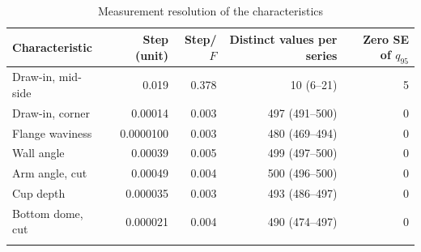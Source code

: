 \documentclass[pdflatex,sn-basic]{sn-jnl}
\newcommand{\tabsize}{\fontsize{8}{9.5}\selectfont}
\begin{document}
\begin{table}[tbp]
\tabsize
\setlength{\tabcolsep}{6pt}
\caption{Measurement resolution of the characteristics}\label{tab:resolution}
\begin{tabular}{@{}lrrrr@{}}
\toprule
Characteristic & Step (unit) & Step/$F$ & Distinct values per series & Zero SE of $q_{95}$ \\
\midrule
Draw-in, mid-side & 0.019 & 0.378 & 10 (6--21) & 5 \\
Draw-in, corner & 0.00014 & 0.003 & 497 (491--500) & 0 \\
Flange waviness & 0.0000100 & 0.003 & 480 (469--494) & 0 \\
Wall angle & 0.00039 & 0.005 & 499 (497--500) & 0 \\
Arm angle, cut & 0.00049 & 0.004 & 500 (496--500) & 0 \\
Cup depth & 0.000035 & 0.003 & 493 (486--497) & 0 \\
Bottom dome, cut & 0.000021 & 0.004 & 490 (474--497) & 0 \\
\botrule
\end{tabular}
\end{table}
\end{document}
